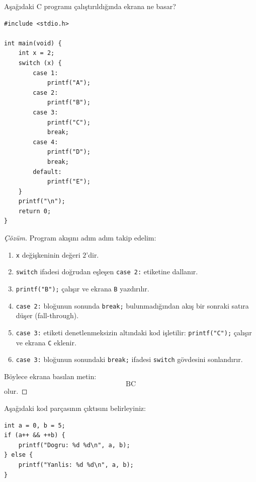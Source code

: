 \begin{example}
Aşağıdaki C programı çalıştırıldığında ekrana ne basar?
\begin{lstlisting}[language=CTemel]
#include <stdio.h>

int main(void) {
    int x = 2;
    switch (x) {
        case 1:
            printf("A");
        case 2:
            printf("B");
        case 3:
            printf("C");
            break;
        case 4:
            printf("D");
            break;
        default:
            printf("E");
    }
    printf("\n");
    return 0;
}
\end{lstlisting}
\end{example}

\begin{proof}[Çözüm]
Program akışını adım adım takip edelim:
\begin{enumerate}
    \item \texttt{x} değişkeninin değeri $2$'dir.
    \item \texttt{switch} ifadesi doğrudan eşleşen \texttt{case 2:} etiketine dallanır.
    \item \texttt{printf("B");} çalışır ve ekrana \texttt{B} yazdırılır.
    \item \texttt{case 2:} bloğunun sonunda \texttt{break;} bulunmadığından akış bir sonraki satıra düşer (fall-through).
    \item \texttt{case 3:} etiketi denetlenmeksizin altındaki kod işletilir: \texttt{printf("C");} çalışır ve ekrana \texttt{C} eklenir.
    \item \texttt{case 3:} bloğunun sonundaki \texttt{break;} ifadesi \texttt{switch} gövdesini sonlandırır.
\end{enumerate}
Böylece ekrana basılan metin:
\[
\text{BC}
\]
olur.
\end{proof}

\begin{example}
Aşağıdaki kod parçasının çıktısını belirleyiniz:
\begin{lstlisting}[language=CTemel]
int a = 0, b = 5;
if (a++ && ++b) {
    printf("Dogru: %d %d\n", a, b);
} else {
    printf("Yanlis: %d %d\n", a, b);
}
\end{lstlisting}
\end{example}

